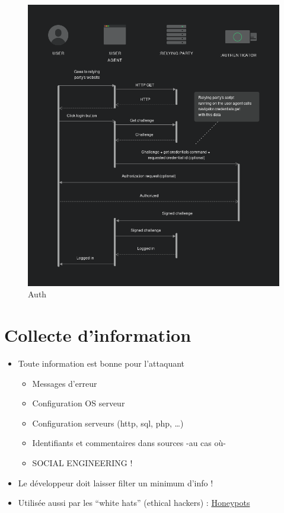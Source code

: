 \begin{figure}
\centering
\includegraphics{src/img/Login.png}
\caption{Auth}
\end{figure}

\hypertarget{collecte-dinformation}{%
\section{Collecte d'information}\label{collecte-dinformation}}

\begin{itemize}
\tightlist
\item
  Toute information est bonne pour l'attaquant

  \begin{itemize}
  \tightlist
  \item
    Messages d'erreur
  \item
    Configuration OS serveur
  \item
    Configuration serveurs (http, sql, php, \ldots)
  \item
    Identifiants et commentaires dans sources -au cas où-
  \item
    SOCIAL ENGINEERING !
  \end{itemize}
\item
  Le développeur doit laisser filter un minimum d'info !
\item
  Utilisée aussi par les ``white hats'' (ethical hackers) :
  \href{https://hackertarget.com/cowrie-honeypot-analysis-24hrs/}{Honeypots}
\end{itemize}


